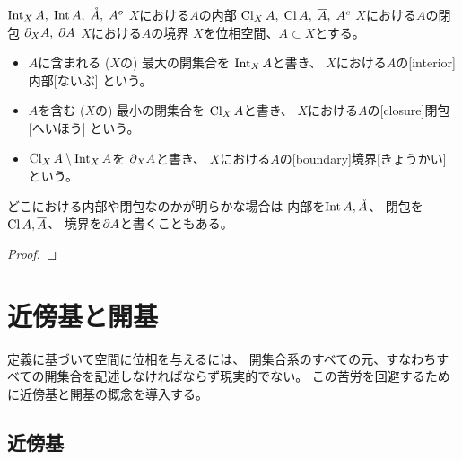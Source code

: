 \documentclass[report]{jlreq}
\begin{document}
\begin{definition}[内部、閉包、境界]
        {$\operatorname{Int}_X A, \; \operatorname{Int} A, \; \mathring{A}, \; A^{o}$}
        {$X$における$A$の内部}
        {$\operatorname{Cl}_X A, \; \operatorname{Cl} A, \; \overline{A}, \; A^{e}$}
        {$X$における$A$の閉包}
        {$\partial_X A, \; \partial A$}
        {$X$における$A$の境界}
    $X$を位相空間、$A \subset X$とする。
    \begin{itemize}
        \item $A$に含まれる ($X$の) 最大の開集合を
            $\operatorname{Int}_X A$と書き、
            $X$における$A$の[interior]{内部}[ないぶ]
            という。
        \item $A$を含む ($X$の) 最小の閉集合を
            $\operatorname{Cl}_X A$と書き、
            $X$における$A$の[closure]{閉包}[へいほう]
            という。
        \item $\operatorname{Cl}_X A \setminus \operatorname{Int}_X A$を
            $\partial_X A$と書き、
            $X$における$A$の[boundary]{境界}[きょうかい]
            という。
    \end{itemize}
    どこにおける内部や閉包なのかが明らかな場合は
    内部を$\operatorname{Int} A, \mathring{A}$、
    閉包を$\operatorname{Cl} A, \overline{A}$、
    境界を$\partial A$と書くこともある。
\end{definition}

\begin{proposition}[内部、閉包、境界の特徴付け]
    \TODO{}
\end{proposition}

\begin{proof}
    \TODO{}
\end{proof}



%
\chapter{近傍基と開基}

定義に基づいて空間に位相を与えるには、
開集合系のすべての元、すなわちすべての開集合を記述しなければならず現実的でない。
この苦労を回避するために近傍基と開基の概念を導入する。

%
\section{近傍基}
\end{document}
